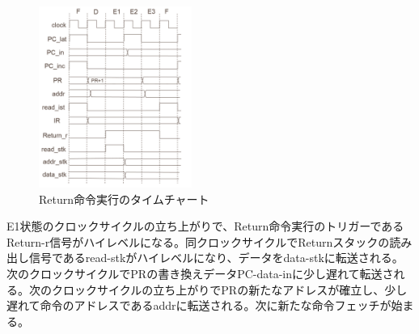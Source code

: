 \documentclass[paper]{ieicej}
\begin{document}
\begin{figure}[h]
    \begin{center}
        \includegraphics[width=50mm]{./fig/Return}
       \caption{Return命令実行のタイムチャート}
    \end{center}
\end{figure}

E1状態のクロックサイクルの立ち上がりで、Return命令実行のトリガーであるReturn-r信号がハイレベルになる。同クロックサイクルでReturnスタックの読み出し信号であるread-stkがハイレベルになり、データをdata-stkに転送される。次のクロックサイクルでPRの書き換えデータPC-data-inに少し遅れて転送される。次のクロックサイクルの立ち上がりでPRの新たなアドレスが確立し、少し遅れて命令のアドレスであるaddrに転送される。次に新たな命令フェッチが始まる。





\end{document}
